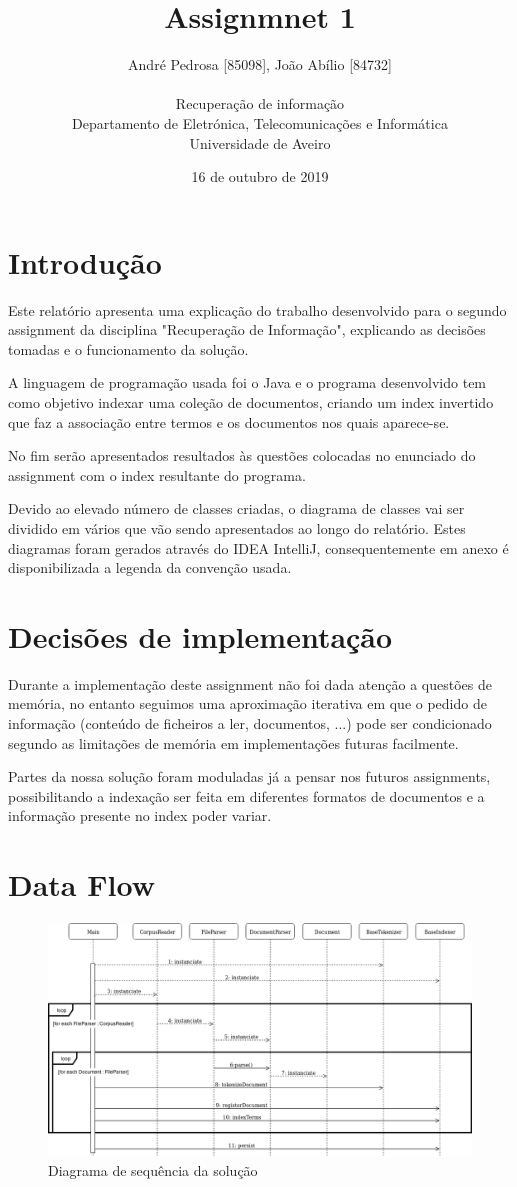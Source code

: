 \documentclass[12pt]{article}
\title{Assignmnet 1}
\author{
    André Pedrosa [85098], João Abílio [84732]\\
    \\
    Recuperação de informação\\
    \normalsize{Departamento de Eletrónica, Telecomunicações e Informática}\\
    \normalsize{Universidade de Aveiro}\\
}
\date{16 de outubro de 2019}
\begin{document}
\baselineskip18pt

\maketitle

\section{Introdução}
Este relatório apresenta uma explicação do trabalho desenvolvido
para o segundo assignment da disciplina "Recuperação de Informação",
explicando as decisões tomadas e o funcionamento da solução.

A linguagem de programação usada foi o Java e o programa desenvolvido
tem como objetivo indexar uma coleção de documentos, criando um index
invertido que faz a associação entre termos e os documentos nos quais
aparece-se.

No fim serão apresentados resultados às questões colocadas no enunciado
do assignment com o index resultante do programa.

Devido ao elevado número de classes criadas, o diagrama de classes vai ser
dividido em vários que vão sendo apresentados ao longo do relatório. Estes
diagramas foram gerados através do IDEA IntelliJ, consequentemente em anexo
é disponibilizada a legenda da convenção usada.

\section{Decisões de implementação}
Durante a implementação deste assignment não foi dada atenção a questões de memória,
no entanto seguimos uma aproximação iterativa em que o pedido de informação
(conteúdo de ficheiros a ler, documentos, ...) pode ser condicionado segundo as
limitações de memória em implementações futuras facilmente.

Partes da nossa solução foram moduladas já a pensar nos futuros assignments,
possibilitando a indexação ser feita em diferentes formatos de documentos e a informação
presente no index poder variar.

\section{Data Flow}
\begin{figure}[h]
  \center
  \includegraphics[width=17cm]{sequenceDiagram.png}
  \caption{Diagrama de sequência da solução}
\end{figure}
\end{document}
